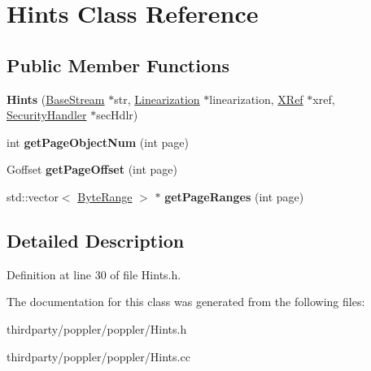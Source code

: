 \hypertarget{class_hints}{}\section{Hints Class Reference}
\label{class_hints}
\subsection*{Public Member Functions}
\begin{DoxyCompactItemize}
\item 
\mbox{\label{class_hints_a528be277975ce51def0e5fca48af2850}} 
{\bfseries Hints} (\hyperlink{class_base_stream}{Base\+Stream} $\ast$str, \hyperlink{class_linearization}{Linearization} $\ast$linearization, \hyperlink{class_x_ref}{X\+Ref} $\ast$xref, \hyperlink{class_security_handler}{Security\+Handler} $\ast$sec\+Hdlr)
\item 
\mbox{\label{class_hints_a94b0edaae7733daaaeb0438a343b10ea}} 
int {\bfseries get\+Page\+Object\+Num} (int page)
\item 
\mbox{\label{class_hints_a0db4e3a2a74de3318a71fb9ec9214717}} 
Goffset {\bfseries get\+Page\+Offset} (int page)
\item 
\mbox{\label{class_hints_ad5d78f6c90780b2c7e71c8fa8e67affc}} 
std\+::vector$<$ \hyperlink{struct___byte_range}{Byte\+Range} $>$ $\ast$ {\bfseries get\+Page\+Ranges} (int page)
\end{DoxyCompactItemize}


\subsection{Detailed Description}


Definition at line 30 of file Hints.\+h.



The documentation for this class was generated from the following files\+:\begin{DoxyCompactItemize}
\item 
thirdparty/poppler/poppler/Hints.\+h\item 
thirdparty/poppler/poppler/Hints.\+cc\end{DoxyCompactItemize}
